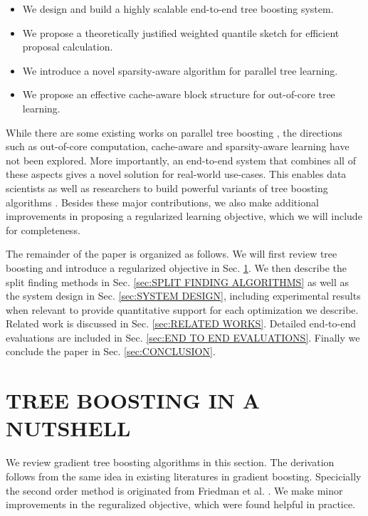 \documentclass[sigconf]{acmart}
\begin{document}
\begin{itemize}
    \item We design and build a highly scalable end-to-end tree boosting system.
    \item We propose a theoretically justified weighted quantile sketch for efficient proposal calculation.
    \item We introduce a novel sparsity-aware algorithm for parallel tree learning.
    \item We propose an effective cache-aware block structure for out-of-core tree learning.
\end{itemize}

While there are some existing works on parallel tree boosting \cite{tyree2011parallel,ye2009stochastic,panda2009planet}, the directions such as out-of-core 
computation, cache-aware and sparsity-aware learning have not been explored. More importantly, an end-to-end system
that combines all of these aspects gives a novel solution for real-world use-cases. This enables data scientists as well as
researchers to build powerful variants of tree boosting algorithms \cite{chen2013general,chen2015efficient}. Besides these major contributions, we also
make additional improvements in proposing a regularized learning objective, which we will include for completeness.

The remainder of the paper is organized as follows. We will first review tree boosting and introduce a regularized
objective in Sec. \ref{sec:TREE BOOSTIONG IN A NUTSHELL}. We then describe the split finding methods in Sec. \ref{sec:SPLIT FINDING ALGORITHMS} as well as the system design in Sec. \ref{sec:SYSTEM DESIGN}, including
experimental results when relevant to provide quantitative support for each optimization we describe. Related work
is discussed in Sec. \ref{sec:RELATED WORKS}. Detailed end-to-end evaluations are included in Sec. \ref{sec:END TO END EVALUATIONS}. Finally we conclude the paper in Sec. \ref{sec:CONCLUSION}.

\section{TREE BOOSTING IN A NUTSHELL}
\label{sec:TREE BOOSTIONG IN A NUTSHELL}
We review gradient tree boosting algorithms in this section. The derivation follows from the same idea in existing
literatures in gradient boosting. Specicially the second order method is originated from Friedman et al. \cite{friedman2000additive}.
We make minor improvements in the reguralized objective, which were found helpful in practice.
\end{document}
